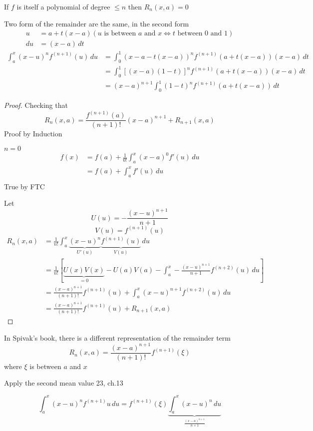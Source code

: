 If $f$ is itself a polynomial of degree $\le n$ then $R_n(x, a) = 0$

Two form of the remainder are the same, in the second form 
\begin{align*}
  u &= a + t(x-a) (u\text{ is between } a \text{ and } x \iff t \text{ between 0 and 1})\\ 
  du &= (x-a)\, dt
\end{align*}
\begin{align*}
  \int_a^x(x-u)^nf^{(n+1)}(u)\, du &= \int_0^1(x-a -t(x-a))^nf^{(n+1)}(a + t(x-a))(x-a)\, dt \\ 
  &= \int_0^1\left[(x-a)(1-t)\right]^nf^{(n+1)}(a + t(x-a))(x-a)\, dt \\
  &= (x-a)^{n+1} \int_0^1(1-t)^nf^{(n+1)}(a + t(x-a))\, dt
\end{align*}

\begin{proof}
  Checking that 
  \[R_n(x, a) = \frac{f^{(n+1)}(a)}{(n+1)!}(x-a)^{n+1} + R_{n+1}(x, a)\]
  Proof by Induction

  $n = 0$
  \begin{align*}
    f(x) &= f(a) + \frac{1}{0!}\int_a^x(x-a)^0f'(u)\, du\\
    &= f(a) + \int_a^x f'(u) \, du\\
  \end{align*}
  True by FTC

  Let
  \[U(u) = -\frac{(x-u)^{n+1}}{n+1}\]
  \[V(u) = f^{(n+1)}(u)\]
  \begin{align*}
    R_n(x, a) &= \frac{1}{n!}\int_a^x\underbrace{(x-u)^n}_{U'(u)}\underbrace{f^{(n+1)}(u)}_{V(u)}\, du\\
    &= \frac{1}{n!}\left[\underbrace{U(x)V(x)}_{=0}-U(a)V(a) -\int_a^x-\frac{(x-u)^{n+1}}{n+1}f^{(n+2)}(u)\, du\right] \\
    &= \frac{(x-a)^{n+1}}{(n+1)!}f^{(n+1)}(u) + \int_a^x (x-u)^{n+1}f^{(n+2)}(u)\, du \\
    &=  \frac{(x-a)^{n+1}}{(n+1)!}f^{(n+1)}(u) + R_{n+1}(x, a) 
  \end{align*}
\end{proof}

In Spivak's book, there is a different representation of the remainder term
\[R_n(x, a) = \frac{(x-a)^{n+1}}{(n+1)!}f^{(n+1)}(\xi)\]
where $\xi$ is between $a$ and $x$

Apply the second mean value 23, ch.13

\[\int_a^x (x-u)^nf^{(n+1)}u\, du = f^{(n+1)}(\xi) \underbrace{\int_a^x (x-u)^n \, du}_{\frac{(x-a)^{n+1}}{n+1}}\]

